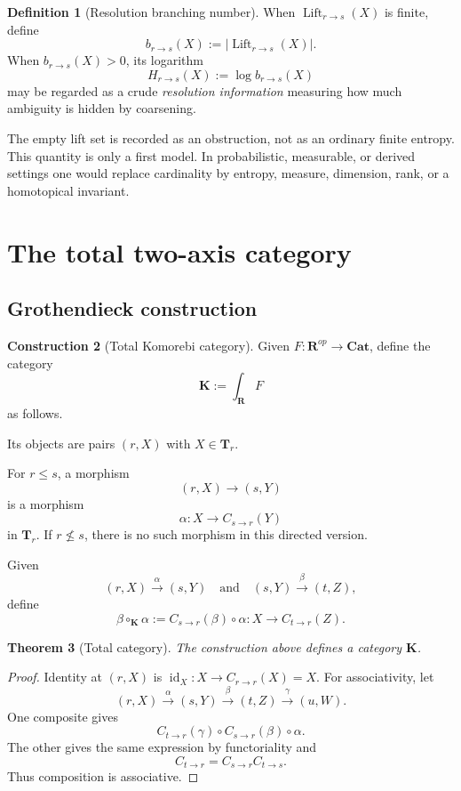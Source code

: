 \documentclass[11pt]{article}
\newtheorem{theorem}{Theorem}[section]
\theoremstyle{definition}
\newtheorem{definition}[theorem]{Definition}
\newtheorem{construction}[theorem]{Construction}
\theoremstyle{remark}
\newcommand{\K}{\mathbf K}
\newcommand{\Rcat}{\mathbf R}
\newcommand{\Tcat}{\mathbf T}
\newcommand{\Cat}{\mathbf{Cat}}
\newcommand{\Lift}{\operatorname{Lift}}
\newcommand{\id}{\operatorname{id}}
\begin{document}
\begin{definition}[Resolution branching number]
When $\Lift_{r\to s}(X)$ is finite, define
\[
b_{r\to s}(X):=|\Lift_{r\to s}(X)|.
\]
When $b_{r\to s}(X)>0$, its logarithm
\[
H_{r\to s}(X):=\log b_{r\to s}(X)
\]
may be regarded as a crude \emph{resolution information} measuring how much ambiguity is hidden by coarsening.
\end{definition}

The empty lift set is recorded as an obstruction, not as an ordinary finite entropy. This quantity is only a first model. In probabilistic, measurable, or derived settings one would replace cardinality by entropy, measure, dimension, rank, or a homotopical invariant.

\section{The total two-axis category}

\subsection{Grothendieck construction}

\begin{construction}[Total Komorebi category]\label{cons:groth}
Given $F:\Rcat^{op}\to\Cat$, define the category
\[
\K:=\int_{\Rcat}F
\]
as follows.

Its objects are pairs $(r,X)$ with $X\in\Tcat_r$.

For $r\le s$, a morphism
\[
(r,X)\longrightarrow(s,Y)
\]
is a morphism
\[
\alpha:X\longrightarrow C_{s\to r}(Y)
\]
in $\Tcat_r$. If $r\nleq s$, there is no such morphism in this directed version.
\end{construction}

Given
\[
(r,X)\xrightarrow{\alpha}(s,Y)
\quad\text{and}\quad
(s,Y)\xrightarrow{\beta}(t,Z),
\]
define
\[
\beta\circ_{\K}\alpha
:=
C_{s\to r}(\beta)\circ\alpha:
X\to C_{t\to r}(Z).
\]

\begin{theorem}[Total category]\label{thm:total-category}
The construction above defines a category $\K$.
\end{theorem}

\begin{proof}
Identity at $(r,X)$ is $\id_X:X\to C_{r\to r}(X)=X$. For associativity, let
\[
(r,X)\xrightarrow{\alpha}(s,Y)
\xrightarrow{\beta}(t,Z)
\xrightarrow{\gamma}(u,W).
\]
One composite gives
\[
C_{t\to r}(\gamma)\circ C_{s\to r}(\beta)\circ\alpha.
\]
The other gives the same expression by functoriality and
\[
C_{t\to r}=C_{s\to r}C_{t\to s}.
\]
Thus composition is associative.
\end{proof}
\end{document}
